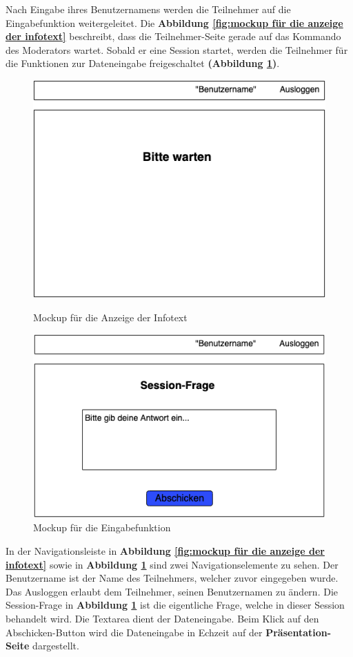 Nach Eingabe ihres Benutzernamens werden die Teilnehmer auf die Eingabefunktion weitergeleitet. Die \textbf{Abbildung \ref{fig:mockup für die anzeige der infotext}} beschreibt, dass die Teilnehmer-Seite gerade auf das Kommando des Moderators wartet. Sobald er eine Session startet, werden die Teilnehmer für die Funktionen zur Dateneingabe freigeschaltet \textbf{(Abbildung \ref{fig:mockup für die eingabefunktion})}.

\begin{figure}[H]
	\centering
  \begin{minipage}[t]{0.45\linewidth}
  	    \includegraphics[width=.75\linewidth]{img/teilnehmerseite2}
		\caption{Mockup für die Anzeige der Infotext}
		\label{fig:mockup für die anzeige der infotext}
  \end{minipage}
\hfill
  \begin{minipage}[t]{0.45\linewidth}
    	    \includegraphics[width=.8\linewidth]{img/teilnehmerseite3}
		\caption{Mockup für die Eingabefunktion}
		\label{fig:mockup für die eingabefunktion}
  \end{minipage}
\end{figure}

In der Navigationsleiste in \textbf{Abbildung \ref{fig:mockup für die anzeige der infotext}} sowie in \textbf{Abbildung \ref{fig:mockup für die eingabefunktion}} sind zwei Navigationselemente zu sehen. Der Benutzername ist der Name des Teilnehmers, welcher zuvor eingegeben wurde. Das Ausloggen erlaubt dem Teilnehmer, seinen Benutzernamen zu ändern. Die Session-Frage in \textbf{Abbildung \ref{fig:mockup für die eingabefunktion}} ist die eigentliche Frage, welche in dieser Session behandelt wird. Die Textarea dient der Dateneingabe. Beim Klick auf den Abschicken-Button wird die Dateneingabe in Echzeit auf der \textbf{Präsentation-Seite} dargestellt.

